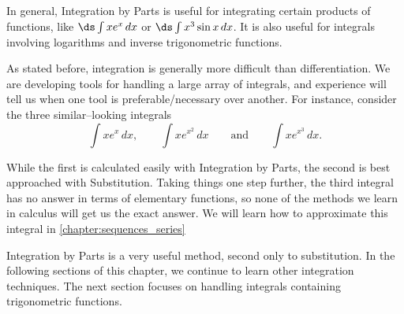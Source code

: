 In general, Integration by Parts is useful for integrating certain products of functions, like $\ds\int x e^x\,dx$ or $\ds\int x^3\sin x\,dx$.   It is also useful for integrals involving logarithms and inverse trigonometric functions.  

As stated before, integration is generally more difficult than differentiation. We are developing tools for handling a large array of integrals, and experience will tell us when one tool is preferable/necessary over another. For instance, consider the three similar--looking integrals 
$$\int xe^x\,dx, \qquad  \int x e^{x^2}\,dx \qquad \text{and} \qquad \int xe^{x^3}\,dx.$$

While the first is calculated easily with Integration by Parts, the second is best approached with Substitution.  Taking things one step further, the third integral has no answer in terms of elementary functions, so none of the methods we learn in calculus will get us the exact answer.  We will learn how to approximate this integral in \autoref{chapter:sequences_series}

Integration by Parts is a very useful method, second only to substitution. In the following sections of this chapter, we continue to learn other integration techniques. The next section focuses on handling integrals containing trigonometric functions.




